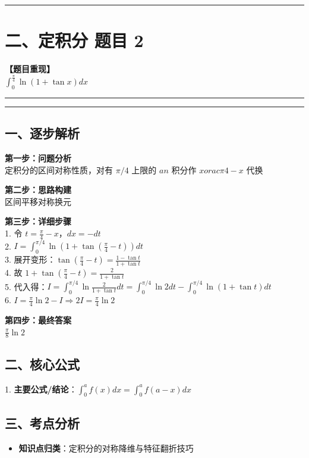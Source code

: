 ﻿\documentclass[12pt, a4paper]{ctexart}
\newcommand{\TopSeparator}{
    \par\noindent\rule{\textwidth}{1.5pt}\vspace{0.5em}
}
\newcommand{\AnalysisSeparator}{
    \par\noindent\rule{\textwidth}{0.5pt}\vspace{0.2em}\hrule\vspace{0.5em}
}
\newenvironment{RedAnalysis}{
    \par
    \color{red} 
}{
    \par
    \color{black} 
}
\begin{document}
\vspace{2em}

\TopSeparator
\section*{二、定积分 题目 2}

\textbf{【题目重现】} \\
$\int_{0}^{\frac{\pi}{4}} \ln(1+\tan x) dx$

\AnalysisSeparator

\begin{RedAnalysis}

	\subsection*{一、逐步解析}

	\textbf{第一步：问题分析} \\
	定积分的区间对称性质，对有 $\pi/4$ 上限的 $	an$ 积分作 $x 	o
		rac{\pi}{4}-x$ 代换

	\textbf{第二步：思路构建} \\
	区间平移对称换元

	\textbf{第三步：详细步骤} \\
	1. 令 $t = \frac{\pi}{4} - x$，$dx = -dt$ \\ 
	2. $I = \int_{0}^{\pi/4} \ln(1+\tan(\frac{\pi}{4}-t)) dt$ \\ 
	3. 展开变形：$\tan(\frac{\pi}{4}-t) = \frac{1-\tan t}{1+\tan t}$ \\ 
	4. 故 $1 + \tan(\frac{\pi}{4}-t) = \frac{2}{1+\tan t}$ \\ 
	5. 代入得：$I = \int_{0}^{\pi/4} \ln\frac{2}{1+\tan t} dt = \int_{0}^{\pi/4} \ln 2 dt - \int_{0}^{\pi/4} \ln(1+\tan t) dt$ \\ 
	6. $I = \frac{\pi}{4}\ln 2 - I \Rightarrow 2I = \frac{\pi}{4}\ln 2$

	\textbf{第四步：最终答案} \\
	$\frac{\pi}{8} \ln 2$

	\subsection*{二、核心公式}
	1. \textbf{主要公式/结论}：$\int_0^a f(x) dx = \int_0^a f(a-x) dx$

	\subsection*{三、考点分析}
	\begin{itemize}
		\item \textbf{知识点归类}：定积分的对称降维与特征翻折技巧
	\end{itemize}

\end{RedAnalysis}
\end{document}
